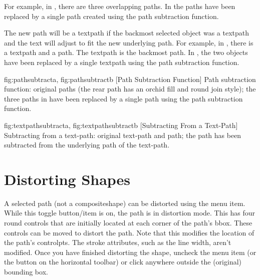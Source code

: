 For example, in
, there are three overlapping
paths.  In  the paths have been
replaced by a single path created using the path subtraction
function.

The new path will be a \gls*{textpath} if the backmost selected
object was a \gls*{textpath} and the text will adjust to fit the
new underlying path. For example, in
, there is a \gls*{textpath}
and a \gls*{path}. The \gls*{textpath} is the backmost path.
In , the two objects have
been replaced by a single \gls*{textpath} using the path subtraction
function.

{
  {fig:pathsubtracta}{}{},
  {fig:pathsubtractb}{}{}
}
[Path Subtraction Function]
{Path subtraction function:
 original paths (the rear path 
has an orchid fill  and round join style);
 the three paths 
in  have
been replaced by a single path using the path subtraction function.}

{
  {fig:textpathsubtracta}{}{},
  {fig:textpathsubtractb}{}{}
}
[Subtracting From a Text-Path]
{Subtracting from a text-path: 
 original text-path and path; 
 the path has been 
subtracted from the underlying path of the text-path.}


\section{Distorting Shapes}\label{sec:distort}


A selected \gls{path} (not a \gls{compositeshape}) can be distorted using the
 menu item. While this toggle
button\slash item is on, the \gls{path} is in distortion mode.
This has four round controls that are initially located at each
corner of the path's \gls{bbox}. These controls can be moved to
distort the path.  Note that this modifies the location of the
path's \glspl{controlpt}. The stroke attributes, such as the line
width, aren't modified. Once you have finished distorting the shape,
uncheck the  menu item (or the
button on the horizontal \gls{toolbar}) or click
anywhere outside the (original) bounding box.

